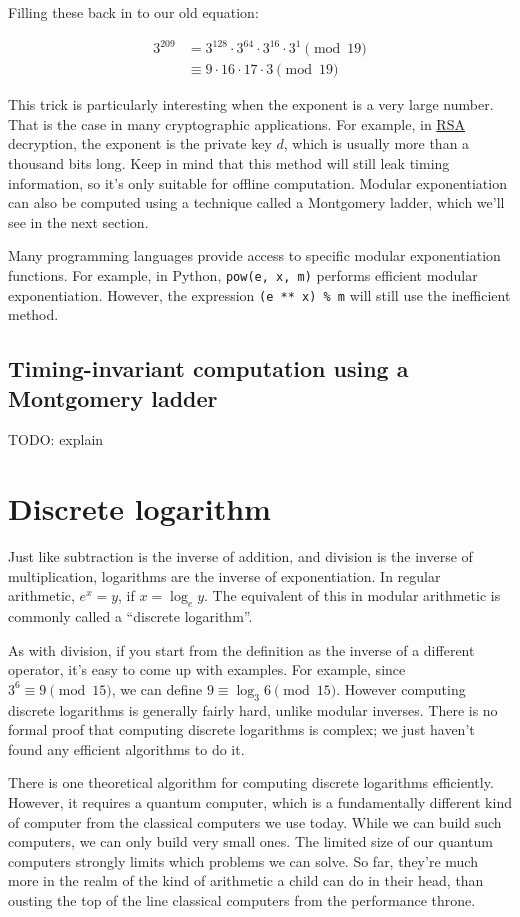\documentclass[11pt,ebook,table,dvipsnames]{memoir}
\begin{document}
Filling these back in to our old equation:

\begin{align*}
3^{209} &=      3^{128} \cdot 3^{64} \cdot 3^{16} \cdot 3^1 \pmod {19} \\
        &\equiv 9       \cdot 16     \cdot 17     \cdot 3   \pmod {19}
\end{align*}

This trick is particularly interesting when the exponent is a very
large number. That is the case in many cryptographic applications. For
example, in \hyperref[RSA]{RSA} decryption, the exponent is the private key $d$, which
is usually more than a thousand bits long. Keep in mind that this
method will still leak timing information, so it's only suitable for
offline computation. Modular exponentiation can also be computed using
a technique called a Montgomery ladder, which we'll see in the next
section.

Many programming languages provide access to specific modular
exponentiation functions. For example, in Python, \verb~pow(e, x, m)~
performs efficient modular exponentiation. However, the expression
\verb~(e ** x) % m~ will still use the inefficient method.
\subsection{Timing-invariant computation using a Montgomery ladder}
\label{sec-4-1-5-2}

TODO: explain
\section{Discrete logarithm}
\label{sec-4-1-6}

Just like subtraction is the inverse of addition, and division is the
inverse of multiplication, logarithms are the inverse of
exponentiation. In regular arithmetic, $e^x = y$, if $x = \log_e y$.
The equivalent of this in modular arithmetic is commonly called a
\enquote{discrete logarithm}.

As with division, if you start from the definition as the inverse of a
different operator, it's easy to come up with examples. For example,
since $3^6 \equiv 9 \pmod {15}$, we can define $9 \equiv \log_3 6
\pmod {15}$. However computing discrete logarithms is generally fairly
hard, unlike modular inverses. There is no formal proof that computing
discrete logarithms is complex; we just haven't found any efficient
algorithms to do it.

There is one theoretical algorithm for computing discrete logarithms
efficiently. However, it requires a quantum computer, which is a
fundamentally different kind of computer from the classical computers
we use today. While we can build such computers, we can only build
very small ones. The limited size of our quantum computers strongly
limits which problems we can solve. So far, they're much more in the
realm of the kind of arithmetic a child can do in their head, than
ousting the top of the line classical computers from the performance
throne.
\end{document}
